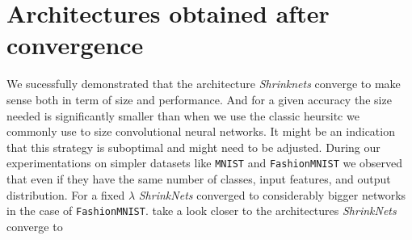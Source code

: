 \section{Architectures obtained after convergence}

We sucessfully demonstrated that the architecture \textit{Shrinknets} converge
to make sense both in term of size and performance. And for a given accuracy the
size needed is significantly smaller than when we use the classic heursitc we
commonly use to size convolutional neural networks. It might be an indication
that this strategy is suboptimal and might need to be adjusted. During our
experimentations on simpler datasets like \texttt{MNIST} and
\texttt{FashionMNIST} we observed that even if they have the same number of
classes, input features, and output distribution. For a fixed $\lambda$
\textit{ShrinkNets} converged to considerably bigger networks in the case of
\texttt{FashionMNIST}.
take a look closer to the architectures \textit{ShrinkNets} converge to